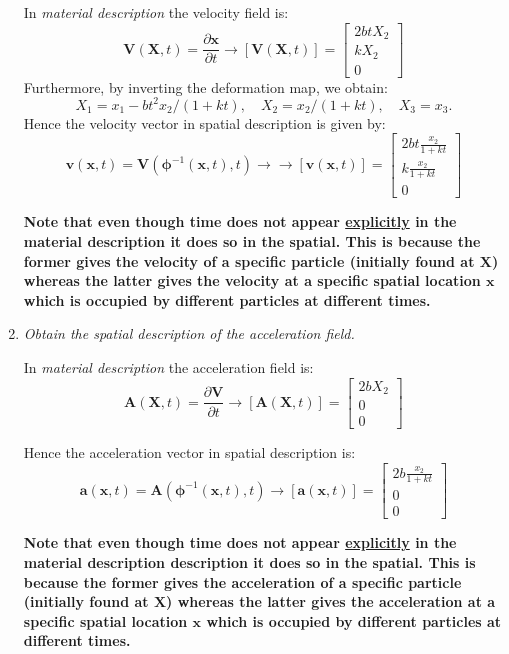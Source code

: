 \documentclass{article}
\newcommand{\ee}{\end{equation}}
\newcommand{\be}{\begin{equation}}
\newcommand{\pa}{\partial}
\newcommand{\bs}{\boldsymbol}
\begin{document}
\begin{enumerate}
In {\em material description} the velocity field is:
\be
\bs{V}(\bs{X},t)=\frac{\pa \bs{x}}{\pa  t} \to [\bs{V}(\bs{X},t)]=\left[\begin{array}{l}  2btX_2 \\ kX_2 \\ 0 \end{array} \right]
\ee
Furthermore, by inverting the deformation map, we obtain:
\be
X_1=x_1-bt^2 x_2/(1+kt), \quad X_2=x_2/(1+kt), \quad X_3=x_3.
\ee
Hence the velocity vector in spatial description is given by:
\be
\bs{v}(\bs{x},t)=\bs{V}(\bs{\phi}^{-1}(\bs{x},t),t) \to \to [\bs{v}(\bs{x},t)]=\left[\begin{array}{l}  2bt \frac{x_2}{1+kt} \\ k\frac{x_2}{1+kt} \\ 0
\end{array} \right]
\ee

\textbf{Note that even though time does not appear \underline{explicitly} in the material description  it does so in the spatial. This is because the former
gives the velocity of a specific particle (initially found at $\bs{X}$) whereas the latter gives the velocity at a specific spatial location $\bs{x}$ which is
occupied by different particles at different times.}

\item {\em Obtain the spatial description of the acceleration field.}


In {\em material description} the acceleration field is:
\be
\bs{A}(\bs{X},t)=\frac{\pa \bs{V}}{\pa  t} \to [\bs{A}(\bs{X},t)]=\left[\begin{array}{l}  2bX_2 \\ 0 \\ 0 \end{array} \right]
\ee

Hence the acceleration vector in spatial description is:
\be
\bs{a}(\bs{x},t)=\bs{A}(\bs{\phi}^{-1}(\bs{x},t),t) \to [\bs{a}(\bs{x},t)]=\left[\begin{array}{l}   2b \frac{x_2}{1+kt} \\ 0 \\ 0 \end{array} \right]
\ee


\textbf{ Note that even though time does not appear \underline{explicitly} in the material description description it does so in the spatial. This is because the former gives the acceleration of a specific  particle (initially found at $\bs{X}$) whereas the latter gives the acceleration at a specific spatial location $\bs{x}$ which is occupied by different particles at different times.}


\end{enumerate}
\end{document}
